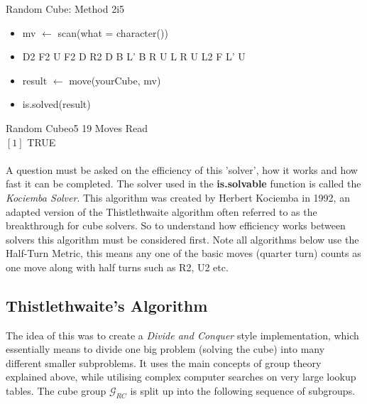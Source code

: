 \documentclass{article}
\newcounter{theo}[section]\setcounter{theo}{0}
\newcounter{lem}[section]\setcounter{lem}{0}
\begin{document}
\begin{myinput}{Random Cube: Method 2}{i5}
\begin{itemize}
\item mv $\leftarrow$ scan(what = character())
\item D2 F2 U F2 D R2 D B L' B R U L R U L2 F L' U
\item result $\leftarrow$ move(yourCube, mv)
\item is.solved(result)
\end{itemize}
\end{myinput}

\begin{myoutput}{Random Cube}{o5}
19 Moves Read \\
$[1]$ TRUE
\end{myoutput}

\paragraph*{}

A question must be asked on the efficiency of this 'solver', how it works and how fast it can be completed. 
The solver used in the \textbf{is.solvable} function is called the \textit{Kociemba Solver}. This algorithm was created by Herbert Kociemba in 1992, an adapted version of the Thistlethwaite algorithm often referred to as the breakthrough for cube solvers\cite{Thistlethwaite}. So to understand how efficiency works between solvers this algorithm must be considered first. Note all algorithms below use the Half-Turn Metric, this means any one of the basic moves (quarter turn) counts as one move along with half turns such as R2, U2 etc. 

\subsection{Thistlethwaite's Algorithm}

The idea of this was to create a \textit{Divide and Conquer} style implementation, which essentially means to divide one big problem (solving the cube) into many different smaller subproblems. It uses the main concepts of group theory explained above, while utilising complex computer searches on very large lookup tables. 
The cube group $\mathcal{G}_{RC}$ is split up into the following sequence of subgroups.  
\end{document}
